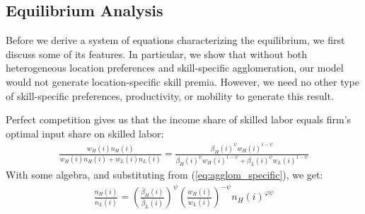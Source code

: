 \documentclass[12 pt]{article}
\begin{document}
\subsection{Equilibrium Analysis}

Before we derive a system of equations characterizing the equilibrium, we first discuss some of its features.  In particular, we show that without both heterogeneous location preferences and skill-specific agglomeration, our model would not generate location-specific skill premia.  However, we need no other type of skill-specific preferences, productivity, or mobility to generate this result.

Perfect competition gives us that the income share of skilled labor equals firm's optimal input share on skilled labor:
\begin{eqnarray}
\frac{w_H(i) n_H(i)}{w_H(i) n_H(i) + w_L(i) n_L(i)}  = \frac{\beta_H(i)^{\psi} w_H(i)^{1-\psi}}{\beta_H(i)^{\psi} w_H(i)^{1-\psi} + \beta_L(i)^{\psi} w_L(i)^{1-\psi}} \nonumber
\end{eqnarray}
With some algebra, and substituting from (\ref{eq:agglom_specific}), we get:
\begin{eqnarray}\label{eq:labor_demand}
    \frac{n_H(i)}{n_L(i)} = \left(\frac{\bar{\beta}_H(i)}{\bar{\beta}_L(i)}\right)^\psi \left(\frac{w_H(i)}{w_L(i)}\right)^{-\psi} n_H(i)^{\varphi \psi }
\end{eqnarray}
\end{document}
